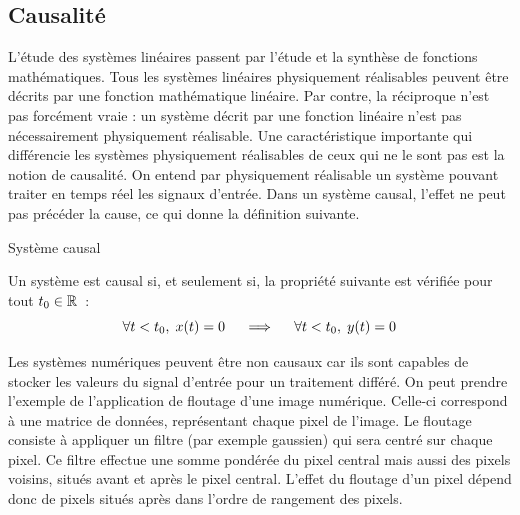 	\subsection{Causalité}
	L'étude des systèmes linéaires passent par l'étude et la
        synthèse de fonctions mathématiques. Tous les systèmes
        linéaires physiquement réalisables peuvent être décrits par
        une fonction mathématique linéaire. Par contre, la réciproque
        n'est pas forcément vraie : un système décrit par une fonction
        linéaire n'est pas nécessairement physiquement réalisable. Une
        caractéristique importante qui différencie les systèmes
        physiquement réalisables de ceux qui ne le sont pas est la
        notion de causalité. On entend par physiquement réalisable un
        système pouvant traiter en temps réel les signaux d'entrée.
        Dans un système causal, l'effet ne peut pas précéder la cause,
        ce qui donne la définition suivante.
        \begin{definition}{Système causal}
          \label{def:causal}
          
          Un système est causal si, et seulement si, la propriété suivante est vérifiée pour tout $t_0 \in\mathbb{R}$~:
          \begin{equation}
            \label{eq:def_causal}
          \forall t<t_{0} ,\;  x(t) = 0 \;\;\;\;\implies\;\;\;\; \forall t<t_{0},\; y(t) = 0
	\end{equation}   
        \end{definition}

       	Les systèmes numériques peuvent être non causaux car ils sont
        capables de stocker les valeurs du signal d'entrée pour un
        traitement différé. On peut prendre l'exemple de l'application
        de floutage d'une image numérique. Celle-ci correspond à une
        matrice de données, représentant chaque pixel de l'image. Le
        floutage consiste à appliquer un filtre (par exemple gaussien)
        qui sera centré sur chaque pixel. Ce filtre effectue une somme
        pondérée du pixel central mais aussi des pixels voisins,
        situés avant et après le pixel central. L'effet du floutage
        d'un pixel dépend donc de pixels situés après dans l'ordre de
        rangement des pixels.

	
	

